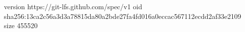 version https://git-lfs.github.com/spec/v1
oid sha256:13ca2c56a3d3a78815da80a2bde27fa4fd016a0eccac567112ecdd2af33e2109
size 455520
